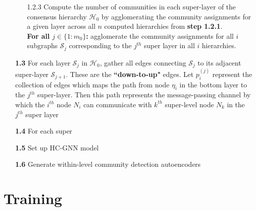 \documentclass[18pt]{article}
\begin{document}
\begin{itemize}
{\begin{itemize}
			\item[1.2.3] {Compute the number of communities in each super-layer of the consensus hierarchy $\mathcal{H}_0$ by agglomerating the community assignments for a given layer across all $n$ computed hierarchies from {\bf step 1.2.1}. \\ 
				\textbf{For all $j \in \{1:m_0\}$:} agglomerate the community assignments for all $i$ subgraphs $\mathcal{S}_j$ corresponding to the $j^{th}$ super layer in all $i$ hierarchies.}
		\end{itemize} } 
	
	\item[\bf 1.3]{For each layer $\mathcal{S}_j$ in $\mathcal{H}_0$, gather all edges connecting $\mathcal{S}_{j}$ to its adjacent super-layer $\mathcal{S}_{j+1}$. These are the \textbf{``down-to-up"} edges. Let $p_i^{(j)}$ represent the collection of edges which maps the path from node $\eta_i$ in the bottom layer to the $j^{th}$ super-layer. Then this path represents the message-passing channel by which the $i^{th}$ node $N_i$ can communicate with $k^{th}$ super-level node $N_k$ in the $j^{th}$ super layer}
	
	\item[\bf 1.4]{For each super }
	
	
	\item[\bf 1.5]{Set up HC-GNN model}
	\item[\bf 1.6]{Generate within-level community detection autoencoders}
		
	\end{itemize}
	
	\section{Training}
	
	
	
	
	
	
	
	
	
	
	
	
	
	
	
	
	
	
	
	
	
	
	
	
	
	
	
	
	
	
	
	
	
	
	
	
	
	
	
	
	
	
	
	
	
	
\end{document}

